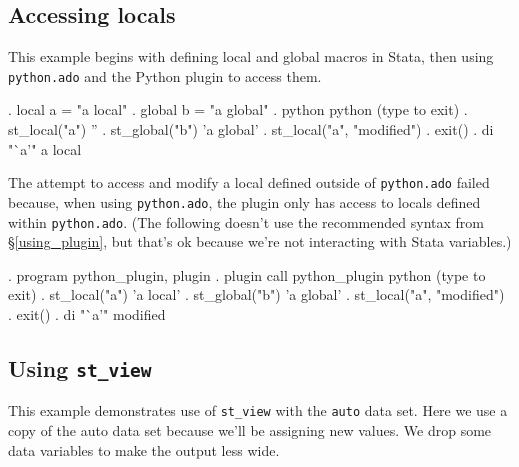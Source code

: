 \documentclass{article}
\begin{document}
\smallskip


\subsection{Accessing locals} \label{local_example}

This example begins with defining local and global macros in Stata, then using \lstinline$python.ado$ and the Python plugin to access them.

\begin{stlog}
. local a = "a local"
{\smallskip}
. global b = "a global"
{\smallskip}
. python
 python (type {} to exit) 
{\bftt{>>>}}. st_local("a")
''
{\smallskip}
{\bftt{>>>}}. st_global("b")
'a global'
{\smallskip}
{\bftt{>>>}}. st_local("a", "modified")
{\smallskip}
{\bftt{>>>}}. exit()
{\smallskip}
. di "`a'"
a local
\end{stlog}

\medskip

The attempt to access and modify a local defined outside of \lstinline$python.ado$ failed because, when using \lstinline$python.ado$, the plugin only has access to locals defined within \lstinline$python.ado$. (The following doesn't use the recommended syntax from \S\ref{using_plugin}, but that's ok because we're not interacting with Stata variables.)

\begin{stlog}
. program python_plugin, plugin
{\smallskip}
. plugin call python_plugin
 python (type {} to exit) 
{\bftt{>>>}}. st_local("a")
'a local'
{\smallskip}
{\bftt{>>>}}. st_global("b")
'a global'
{\smallskip}
{\bftt{>>>}}. st_local("a", "modified")
{\smallskip}
{\bftt{>>>}}. exit()
{\smallskip}
. di "`a'"
modified
\end{stlog}

\smallskip



\subsection{Using \lstinline{st_view}} \label{st_view_example}

This example demonstrates use of \lstinline{st_view} with the \lstinline{auto} data set. Here we use a copy of the auto data set because we'll be assigning new values. We drop some data variables to make the output less wide.
\end{document}
